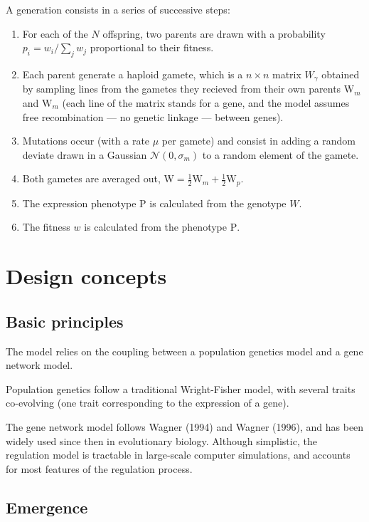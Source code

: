 \documentclass{article}
\begin{document}
A generation consists in a series of successive steps:
\begin{enumerate}
\item For each of the $N$ offspring, two parents are drawn with a probability $p_i = w_i / \sum_j w_j$ proportional to their fitness. 
\item Each parent generate a haploid gamete, which is a $n \times n$ matrix $W_\gamma$ obtained by sampling lines from the gametes they recieved from their own parents $\bm{\mathrm W}_m$ and $\bm{\mathrm W}_m$ (each line of the matrix stands for a gene, and the model assumes free recombination --- no genetic linkage --- between genes). 
\item Mutations occur (with a rate $\mu$ per gamete) and consist in adding a random deviate drawn in a Gaussian $\mathcal N(0,\sigma_m)$ to a random element of the gamete.
\item Both gametes are averaged out, $\bm{\mathrm W} = \frac{1}{2} \bm{\mathrm W}_m + \frac{1}{2} \bm{\mathrm W}_p$. 
\item The expression phenotype $\bm{\mathrm P}$ is calculated from the genotype $W$.
\item The fitness $w$ is calculated from the phenotype $\bm{\mathrm P}$. 
\end{enumerate}

\section{Design concepts}

\subsection{Basic principles}

The model relies on the coupling between a population genetics model and a gene network model. 

Population genetics follow a traditional Wright-Fisher model, with several traits co-evolving (one trait corresponding to the expression of a gene). 

The gene network model follows Wagner (1994) and Wagner (1996), and has been widely used since then in evolutionary biology. Although simplistic, the regulation model is tractable in large-scale computer simulations, and accounts for most features of the regulation process. 

\subsection{Emergence}
\end{document}
